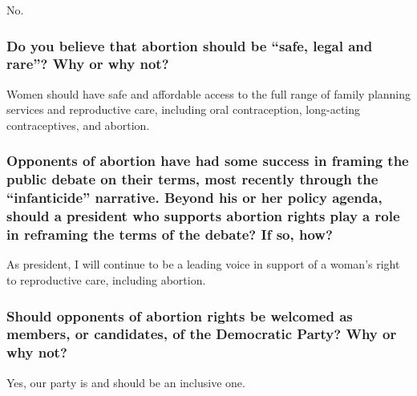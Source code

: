 No.

\hypertarget{do-you-believe-that-abortion-should-be-safe-legal-and-rare-why-or-why-not}{%
\subsubsection{Do you believe that abortion should be ``safe, legal and
rare''? Why or why
not?}\label{do-you-believe-that-abortion-should-be-safe-legal-and-rare-why-or-why-not}}

Women should have safe and affordable access to the full range of family
planning services and reproductive care, including oral contraception,
long-acting contraceptives, and abortion.

\hypertarget{opponents-of-abortion-have-had-some-success-in-framing-the-public-debate-on-their-terms-most-recently-through-the-infanticide-narrative-beyond-his-or-her-policy-agenda-should-a-president-who-supports-abortion-rights-play-a-role-in-reframing-the-terms-of-the-debate-if-so-how}{%
\subsubsection{Opponents of abortion have had some success in framing
the public debate on their terms, most recently through the
``infanticide'' narrative. Beyond his or her policy agenda, should a
president who supports abortion rights play a role in reframing the
terms of the debate? If so,
how?}\label{opponents-of-abortion-have-had-some-success-in-framing-the-public-debate-on-their-terms-most-recently-through-the-infanticide-narrative-beyond-his-or-her-policy-agenda-should-a-president-who-supports-abortion-rights-play-a-role-in-reframing-the-terms-of-the-debate-if-so-how}}

As president, I will continue to be a leading voice in support of a
woman's right to reproductive care, including abortion.

\hypertarget{should-opponents-of-abortion-rights-be-welcomed-as-members-or-candidates-of-the-democratic-party-why-or-why-not}{%
\subsubsection{Should opponents of abortion rights be welcomed as
members, or candidates, of the Democratic Party? Why or why
not?}\label{should-opponents-of-abortion-rights-be-welcomed-as-members-or-candidates-of-the-democratic-party-why-or-why-not}}

Yes, our party is and should be an inclusive one.


